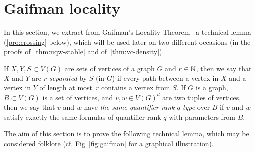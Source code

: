 \section{Gaifman locality}\label{sec:gaifman}
In this section, we extract from Gaifman's Locality Theorem~\cite{gaifman1982local} a technical lemma
(\cref{pro:crossing} below), which will be used later on two different occasions (in the proofs of~\cref{thm:uqw-stable} and
of~\cref{thm:vc-density}).



If $X,Y,S\subset V(G)$ are sets of vertices of a graph $G$ 
and $r\in \mathbb{N}$, then we say that $X$ and $Y$ are  \emph{$r$-separated}
by $S$  (in $G$) if every path between a vertex in $X$ and a vertex in 
$Y$ of length at most~$r$ contains a vertex from $S$. If $G$ is a graph, $B\subset V(G)$ is a set of vertices,
and $v,w\in V(G)^d$ are two tuples of vertices, then we say that 
$v$ and $w$ have \emph{the same quantifier rank $q$ type} over $B$
if $v$ and $w$ satisfy exactly the same formulas of quantifier rank $q$ with parameters from $B$.



The aim of this section is to prove the following technical lemma, which
may be considered folklore (cf. Fig~\ref{fig:gaifman} for a graphical illustration). 


